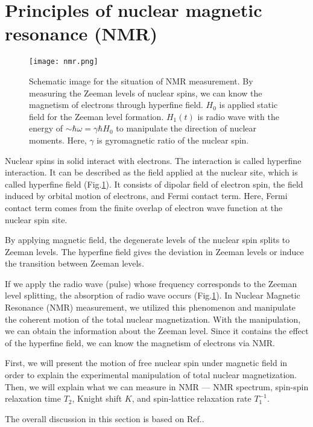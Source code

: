 \newpage
\section{Principles of nuclear magnetic resonance (NMR)}
\label{explanation_of_NMR}

\begin{figure}[h]
  \centering
  \texttt{[image: nmr.png]}
  \caption{Schematic image for the situation of NMR measurement.
  By measuring the Zeeman levels of nuclear spins, we can know the magnetism of electrons through hyperfine field.
  $H_0$ is applied static field for the Zeeman level formation.
  $H_1(t)$ is radio wave with the energy of $\sim\hbar\omega = \gamma\hbar H_0$ to manipulate the direction of nuclear moments.
  Here, $\gamma$ is gyromagnetic ratio of the nuclear spin.}
  \label{nmr}
\end{figure}

Nuclear spins in solid interact with electrons.
The interaction is called hyperfine interaction.
It can be described as the field applied at the nuclear site, which is called hyperfine field (Fig.\ref{nmr}).
It consists of dipolar field of electron spin, the field induced by orbital motion of electrons, and Fermi contact term.
Here, Fermi contact term comes from the finite overlap of electron wave function at the nuclear spin site.

By applying magnetic field, the degenerate levels of the nuclear spin splits to Zeeman levels.
The hyperfine field gives the deviation in Zeeman levels or induce the transition between Zeeman levels.

If we apply the radio wave (pulse) whose frequency corresponds to the Zeeman level splitting, the absorption of radio wave occurs (Fig.\ref{nmr}).
In Nuclear Magnetic Resonance (NMR) measurement, we utilized this phenomenon and manipulate the coherent motion of the total nuclear magnetization.
With the manipulation, we can obtain the information about the Zeeman level.
Since it contains the effect of the hyperfine field, we can know the magnetism of electrons via NMR.

First, we will present the motion of free nuclear spin under magnetic field in order to explain the experimental manipulation of total nuclear magnetization.
Then, we will explain what we can measure in NMR --- NMR spectrum, spin-spin relaxation time $T_2$, Knight shift $K$, and spin-lattice relaxation rate $T^{-1}_1$.

The overall discussion in this section is based on Ref.\cite{Kitaoka, Asayama, Takigawa}.

